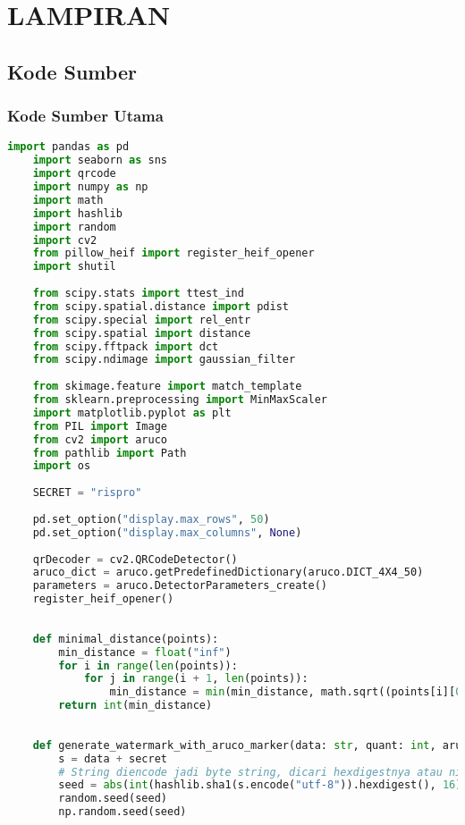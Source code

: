 \chapter*{LAMPIRAN}
\section{Kode Sumber}
\subsection{Kode Sumber Utama}
\begin{lstlisting}[language=Python]
    import pandas as pd
    import seaborn as sns
    import qrcode
    import numpy as np
    import math
    import hashlib
    import random
    import cv2
    from pillow_heif import register_heif_opener
    import shutil
    
    from scipy.stats import ttest_ind
    from scipy.spatial.distance import pdist
    from scipy.special import rel_entr
    from scipy.spatial import distance
    from scipy.fftpack import dct
    from scipy.ndimage import gaussian_filter
    
    from skimage.feature import match_template
    from sklearn.preprocessing import MinMaxScaler
    import matplotlib.pyplot as plt
    from PIL import Image
    from cv2 import aruco
    from pathlib import Path
    import os
    
    SECRET = "rispro"
    
    pd.set_option("display.max_rows", 50)
    pd.set_option("display.max_columns", None)
    
    qrDecoder = cv2.QRCodeDetector()
    aruco_dict = aruco.getPredefinedDictionary(aruco.DICT_4X4_50)
    parameters = aruco.DetectorParameters_create()
    register_heif_opener()
    
    
    def minimal_distance(points):
        min_distance = float("inf")
        for i in range(len(points)):
            for j in range(i + 1, len(points)):
                min_distance = min(min_distance, math.sqrt((points[i][0] - points[j][0]) ** 2 + (points[i][1] - points[j][1]) ** 2))
        return int(min_distance)
    
    
    def generate_watermark_with_aruco_marker(data: str, quant: int, aruco_size: int, wtm_size: tuple = (100, 100), secret: str = SECRET) -> np.ndarray:
        s = data + secret
        # String diencode jadi byte string, dicari hexdigestnya atau nilai hashnya menggunakan algoritma sha1, mengubah output hexdigest string jadi integer 16 bit, lalu mengambil nilai absolutnya (harus positif) lalu disederhanakan menjadi 32 bit integer
        seed = abs(int(hashlib.sha1(s.encode("utf-8")).hexdigest(), 16)) % 2**32
        random.seed(seed)
        np.random.seed(seed)
    

\end{lstlisting}
